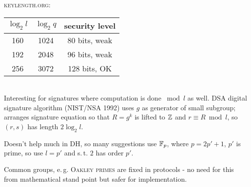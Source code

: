 \textsc{keylength.org}:

\begin{tabular}{c|c|c}
$\log_2 l$ & $\log_2 q$ & security level \\
\hline
160 & 1024 & 80 bits, weak \\
192 & 2048 & 96 bits, weak \\
256 & 3072 & 128 bits, OK
\end{tabular}\ \\

Interesting for signatures where computation is done $\bmod l$ as well. \textsc{DSA} digital signature algorithm (\textsc{NIST/NSA 1992}) uses $g$ as generator of small subgroup; arranges signature equation so that $R = g^k$ is lifted to $\mathbb{Z}$ and $r \equiv R \bmod l$,  so $(r,s)$ has length $2 \log_2 l$.

Doesn't help much in \textsc{DH}, so many suggestions use $\mathbb{F}_p$, where $p = 2p' + 1$, $p'$ is prime, so use $l = p'$ and s.\,t. $2$ has order $p'$.

Common groups, e.\,g. \textsc{Oakley primes} are fixed in protocols - no need for this from mathematical stand point but safer for implementation.